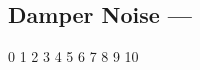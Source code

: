 \subsection[Damper Noise]{Damper Noise --- \UiKey{\I}\UiKey{\SET}}









































0
1
2
3
4
5
6
7
8
9
10
